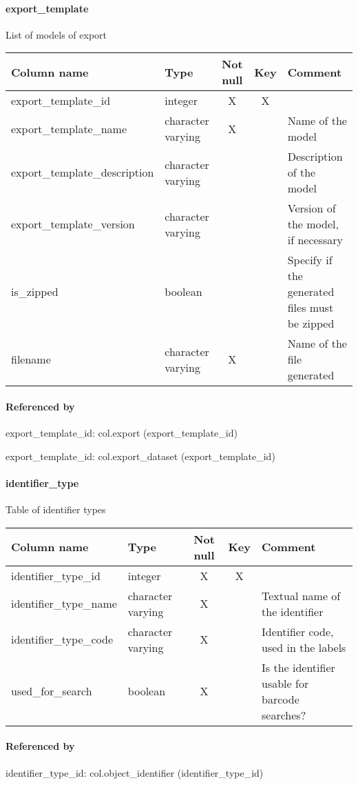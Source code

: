 \paragraph{export\_template}
List of models of export

\begin{tabular}{|l| p{2cm}|c|c| p{5cm}|}
\hline
Column name & Type & Not null & Key & Comment \\
\hline
export\_template\_id & integer & X & X & \\
export\_template\_name & character varying & X &  & Name of the model\\
export\_template\_description & character varying &  &  & Description of the model\\
export\_template\_version & character varying &  &  & Version of the model, if necessary\\
is\_zipped & boolean &  &  & Specify if the generated files must be zipped\\
filename & character varying & X &  & Name of the file generated\\
\hline
\end{tabular}
\paragraph{Referenced by}
export\_template\_id: col.export (export\_template\_id)

export\_template\_id: col.export\_dataset (export\_template\_id)

\paragraph{identifier\_type}
Table of identifier types

\begin{tabular}{|l| p{2cm}|c|c| p{5cm}|}
\hline
Column name & Type & Not null & Key & Comment \\
\hline
identifier\_type\_id & integer & X & X & \\
identifier\_type\_name & character varying & X &  & Textual name of the identifier\\
identifier\_type\_code & character varying & X &  & Identifier code, used in the labels\\
used\_for\_search & boolean & X &  & Is the identifier usable for barcode searches?\\
\hline
\end{tabular}
\paragraph{Referenced by}
identifier\_type\_id: col.object\_identifier (identifier\_type\_id)

